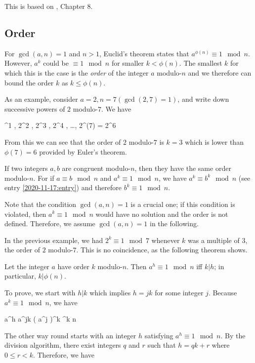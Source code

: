 
This is based on \cite{Burton2011}, Chapter 8.

\subsection{Order}

For $\gcd(a,n)=1$ and $n > 1$, Euclid's theorem states that $a^{\phi(n)} \equiv 1 \mod n$. However, $a^k$ could be $\equiv 1 \mod n$ for smaller $k < \phi(n)$. The smallest $k$ for which this is the case is the \emph{order} of the integer $a$ modulo-$n$ and we therefore can bound the order $k$ as $k \leq \phi(n)$.

As an example, consider $a = 2, n = 7 (\gcd(2,7)=1)$, and write down successive powers of $2$ modulo-$7$. We have

^1  , 2^2  , 2^3  , 2^4  , \ldots, 2^{\phi(7)} = 2^6  
\eee

From this we can see that the order of $2$ modulo-$7$ is $k=3$ which is lower than $\phi(7) = 6$ provided by Euler's theorem.

If two integers $a, b$ are congruent modulo-$n$, then they have the same order modulo-$n$. For if $a \equiv b \mod n$ and $a^k \equiv 1 \mod n$, we have $a^k \equiv b^k \mod n$ (see entry \ref{2020-11-17:entry}) and therefore $b^k \equiv 1 \mod n$.

Note that the condition $\gcd(a,n)=1$ is a crucial one; if this condition is violated, then $a^k \equiv 1 \mod n$ would have no solution and the order is not defined. Therefore, we assume $\gcd(a,n)=1$ in the following.

In the previous example, we had $2^k \equiv 1 \mod 7$ whenever $k$ was a multiple of $3$, the order of $2$ modulo-$7$. This is no coincidence, as the following theorem shows.

\begin{theorem}
  Let the integer $a$ have order $k$ modulo-$n$. Then $a^h \equiv 1 \mod n$ iff $k | h$; in particular, $k | \phi(n)$.
\end{theorem}

To prove, we start with $h | k$ which implies $h = jk$ for some integer $j$. Because $a^k \equiv 1 \mod n$, we have

\bee
a^h \equiv a^{jk} \equiv \left( a^j \right)^k ^k  \mod n
\eee

The other way round starts with an integer $h$ satisfying $a^h \equiv 1 \mod n$. By the division algorithm, there exist integers $q$ and $r$ such that $h = qk+r$ where $0 \leq r < k$. Therefore, we have

